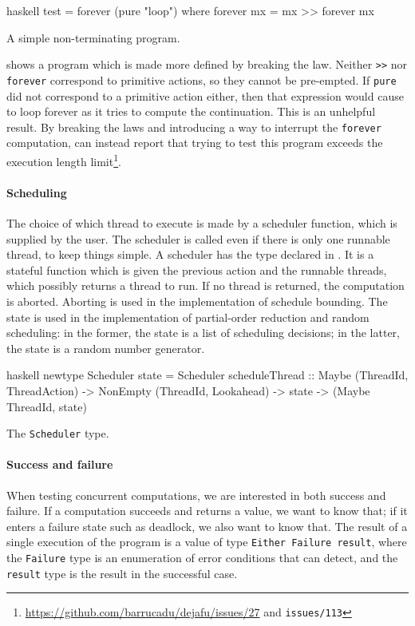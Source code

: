 \begin{listing}
\centering
\begin{cminted}{haskell}
test = forever (pure "loop") where
  forever mx = mx >> forever mx
\end{cminted}
\caption{A simple non-terminating program.}\label{lst:forever}
\end{listing}

 shows a program which is made more defined by
breaking the law.  Neither \verb|>>| nor \verb|forever| correspond to
primitive actions, so they cannot be pre-empted.  If \verb|pure| did
not correspond to a primitive action either, then that expression
would cause \dejafu{} to loop forever as it tries to compute the
continuation.  This is an unhelpful result.  By breaking the laws and
introducing a way to interrupt the \verb|forever| computation,
\dejafu{} can instead report that trying to test this program exceeds
the execution length
limit\footnote{\url{https://github.com/barrucadu/dejafu/issues/27} and
  \texttt{issues/113}}.

\paragraph{Scheduling}
The choice of which thread to execute is made by a scheduler function,
which is supplied by the user.  The scheduler is called even if there
is only one runnable thread, to keep things simple.  A scheduler has
the type declared in .  It is a stateful function
which is given the previous action and the runnable threads, which
possibly returns a thread to run.  If no thread is returned, the
computation is aborted.  Aborting is used in the implementation of
schedule bounding.  The state is used in the implementation of
partial-order reduction and random scheduling: in the former, the
state is a list of scheduling decisions; in the latter, the state is a
random number generator.

\begin{listing}
\centering
\begin{cminted}{haskell}
newtype Scheduler state = Scheduler
  { scheduleThread
    :: Maybe (ThreadId, ThreadAction)
    -> NonEmpty (ThreadId, Lookahead)
    -> state
    -> (Maybe ThreadId, state)
  }
\end{cminted}
\caption{The \dejafu{} \texttt{Scheduler} type.}\label{lst:scheduler}
\end{listing}

\paragraph{Success and failure}
When testing concurrent computations, we are interested in both
success and failure.  If a computation succeeds and returns a value,
we want to know that; if it enters a failure state such as deadlock,
we also want to know that.  The result of a single execution of the
program is a value of type \verb|Either Failure result|, where the
\verb|Failure| type is an enumeration of error conditions that
\dejafu{} can detect, and the \verb|result| type is the result in the
successful case.

